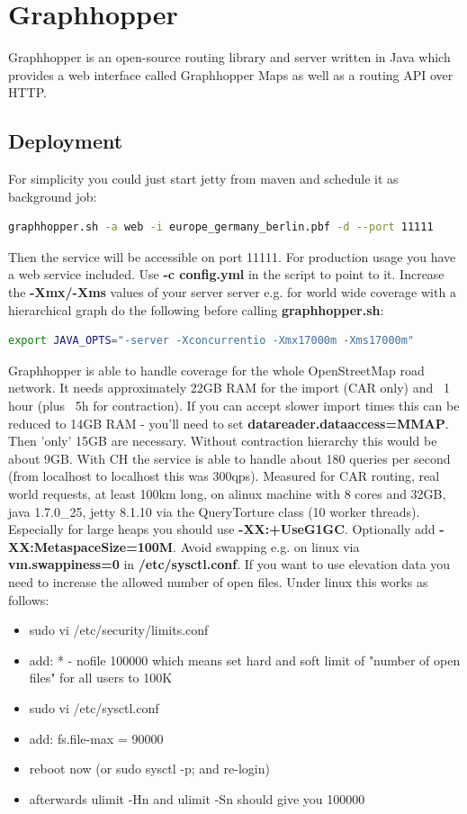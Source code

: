 \documentclass[12pt]{article}
\begin{document}
\section{Graphhopper}
Graphhopper is an open-source routing library and server written in Java which provides a web
interface called Graphhopper Maps as well as a routing API over HTTP.
\subsection{Deployment}
For simplicity you could just start jetty from maven and schedule it as background job: 
\begin{lstlisting}[language=bash,breaklines=true]
graphhopper.sh -a web -i europe_germany_berlin.pbf -d --port 11111
\end{lstlisting}
Then the service will be accessible on port 11111.
For production usage you have a web service included. Use \textbf{-c config.yml} in the script to point to
it. Increase the \textbf{-Xmx/-Xms} values of your server server e.g. for world wide coverage with a
hierarchical graph do the following before calling \textbf{graphhopper.sh}:
\begin{lstlisting}[language=bash,breaklines=true]
export JAVA_OPTS="-server -Xconcurrentio -Xmx17000m -Xms17000m"
\end{lstlisting}
Graphhopper is able to handle coverage for the whole OpenStreetMap road network. It needs
approximately 22GB RAM for the import (CAR only) and ~1 hour (plus ~5h for contraction). If
you can accept slower import times this can be reduced to 14GB RAM - you'll need to set
\textbf{datareader.dataaccess=MMAP}. Then 'only' 15GB are necessary. Without contraction hierarchy this would be about 9GB. With CH the service is able to handle about 180 queries per second (from localhost to localhost this was 300qps). Measured for CAR routing, real world requests, at least 100km long, on alinux machine with 8 cores and 32GB, java 1.7.0\_25, jetty 8.1.10 via the QueryTorture class (10
worker threads).\\
Especially for large heaps you should use \textbf{-XX:+UseG1GC}. Optionally add \textbf{-XX:MetaspaceSize=100M}.
Avoid swapping e.g. on linux via \textbf{vm.swappiness=0} in \textbf{/etc/sysctl.conf}.
If you want to use elevation data you need to increase the allowed number of open files. Under
linux this works as follows:
\begin{itemize}
\item sudo vi /etc/security/limits.conf
\item add: * - nofile 100000 which means set hard and soft limit of "number of open files" for all users to 100K
\item sudo vi /etc/sysctl.conf
\item add: fs.file-max = 90000
\item reboot now (or sudo sysctl -p; and re-login)
\item afterwards ulimit -Hn and ulimit -Sn should give you 100000
\end{itemize}
\end{document}
